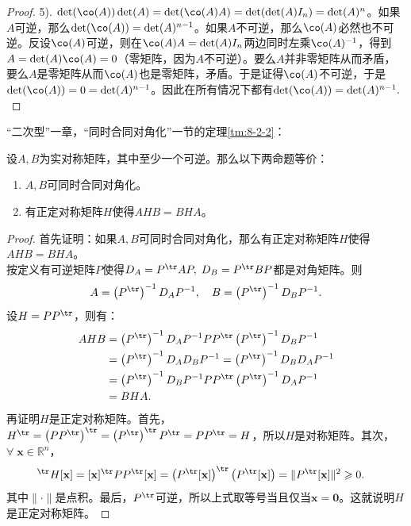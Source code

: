 \documentclass[12pt,UTF8]{ctexbook}
\begin{document}
\begin{appendix}
\begin{proof}
    5). $\det(\co(A))\det(A) = \det(\co(A)A) = \det(\det(A)I_n) = \det(A)^{n}$。如果$A$可逆，那么$\det(\co(A)) = \det(A)^{n-1}$。如果$A$不可逆，那么$\co(A)$必然也不可逆。反设$\co(A)$可逆，则在$\co(A)A = \det(A)I_n$两边同时左乘$\co(A)^{-1}$，得到$A = \det(A)\co(A) = 0$（零矩阵，因为$A$不可逆）。要么$A$并非零矩阵从而矛盾，要么$A$是零矩阵从而$\co(A)$也是零矩阵，矛盾。于是证得$\co(A)$不可逆，于是$\det(\co(A)) = 0 = \det(A)^{n-1}$。因此在所有情况下都有$\det(\co(A)) = \det(A)^{n-1}.$
\end{proof}

“二次型”一章，“同时合同对角化”一节的定理\ref{tm:8-2-2}：
\begin{tm}\label{c-30}
    设$A,B$为实对称矩阵，其中至少一个可逆。那么以下两命题等价：
    \begin{enumerate}
        \item $A,B$可同时合同对角化。
        \item 有正定对称矩阵$H$使得$AHB=BHA$。
    \end{enumerate}
\end{tm}

\begin{proof}
    首先证明：如果$A,B$可同时合同对角化，那么有正定对称矩阵$H$使得$AHB=BHA$。\\
    按定义有可逆矩阵$P$使得$D_A = P^{\tr}AP,\; D_B = P^{\tr}BP$都是对角矩阵。则
    $$A = \left(P^{\tr}\right)^{-1}D_AP^{-1}, \quad B = \left(P^{\tr}\right)^{-1}D_BP^{-1}.$$
    设$H = PP^{\tr}$，则有：
    \begin{align*}
        AHB &= \left(P^{\tr}\right)^{-1}D_AP^{-1}PP^{\tr}\left(P^{\tr}\right)^{-1}D_BP^{-1} \\
        &= \left(P^{\tr}\right)^{-1}D_AD_BP^{-1} = \left(P^{\tr}\right)^{-1}D_BD_AP^{-1} \\
        &= \left(P^{\tr}\right)^{-1}D_BP^{-1}PP^{\tr}\left(P^{\tr}\right)^{-1}D_AP^{-1} \\
        &= BHA.
    \end{align*}
    再证明$H$是正定对称矩阵。首先，$H^{\tr} = \left(PP^{\tr}\right)^{\tr} = \left(P^{\tr}\right)^{\tr}P^{\tr} = PP^{\tr} = H$，所以$H$是对称矩阵。其次，$\forall \;\mathbf{x}\in\mathbb{R}^n$，
    \begin{align*}
        [\mathbf{x}]^{\tr}H[\mathbf{x}] &= [\mathbf{x}]^{\tr}PP^{\tr}[\mathbf{x}] = \left(P^{\tr}[\mathbf{x}]\right)^{\tr}\left(P^{\tr}[\mathbf{x}]\right) = \|P^{\tr}[\mathbf{x}]\|^2 \geqslant 0.
    \end{align*} 
    其中$\|\cdot \|$是点积。最后，$P^{\tr}$可逆，所以上式取等号当且仅当$\mathbf{x} = \mathbf{0}$。这就说明$H$是正定对称矩阵。
    

\end{proof}
\end{appendix}
\end{document}

